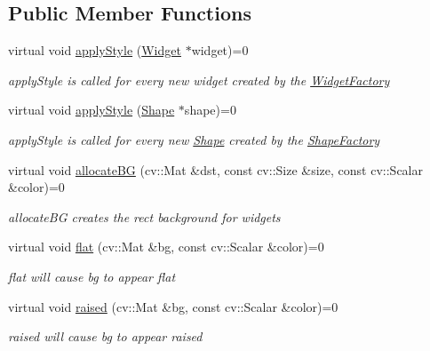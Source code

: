 \subsection*{Public Member Functions}
\begin{DoxyCompactItemize}
\item 
virtual void \hyperlink{classcanvascv_1_1Theme_a38ea37c836acfb37ee9b4d201c1f369b}{apply\+Style} (\hyperlink{classcanvascv_1_1Widget}{Widget} $\ast$widget)=0
\begin{DoxyCompactList}\small\item\em apply\+Style is called for every new widget created by the \hyperlink{classcanvascv_1_1WidgetFactory}{Widget\+Factory} \end{DoxyCompactList}\item 
virtual void \hyperlink{classcanvascv_1_1Theme_a0730fd4b881d57ee9d7b377238f8d24b}{apply\+Style} (\hyperlink{classcanvascv_1_1Shape}{Shape} $\ast$shape)=0
\begin{DoxyCompactList}\small\item\em apply\+Style is called for every new \hyperlink{classcanvascv_1_1Shape}{Shape} created by the \hyperlink{classcanvascv_1_1ShapeFactory}{Shape\+Factory} \end{DoxyCompactList}\item 
virtual void \hyperlink{classcanvascv_1_1Theme_a5f8c0e382d893419f9097bbc07e04130}{allocate\+BG} (cv\+::\+Mat \&dst, const cv\+::\+Size \&size, const cv\+::\+Scalar \&color)=0
\begin{DoxyCompactList}\small\item\em allocate\+BG creates the rect background for widgets \end{DoxyCompactList}\item 
virtual void \hyperlink{classcanvascv_1_1Theme_a2a7cbe4666031dcecfa50fa3dd1ec711}{flat} (cv\+::\+Mat \&bg, const cv\+::\+Scalar \&color)=0
\begin{DoxyCompactList}\small\item\em flat will cause bg to appear flat \end{DoxyCompactList}\item 
virtual void \hyperlink{classcanvascv_1_1Theme_ae23eaf232b60504c82fc46b59ccfee67}{raised} (cv\+::\+Mat \&bg, const cv\+::\+Scalar \&color)=0
\begin{DoxyCompactList}\small\item\em raised will cause bg to appear raised \end{DoxyCompactList}\item 

\end{DoxyCompactItemize}
